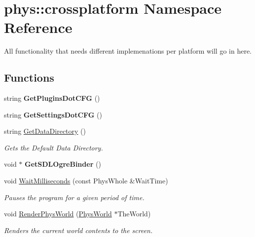 \hypertarget{namespacephys_1_1crossplatform}{
\section{phys::crossplatform Namespace Reference}
\label{d4/d59/namespacephys_1_1crossplatform}
}


All functionality that needs different implemenations per platform will go in here.  


\subsection*{Functions}
\begin{DoxyCompactItemize}
\item 
\hypertarget{namespacephys_1_1crossplatform_a8f7321f409f1f2a5fa07881ae22fcc2d}{
string {\bfseries GetPluginsDotCFG} ()}
\label{d4/d59/namespacephys_1_1crossplatform_a8f7321f409f1f2a5fa07881ae22fcc2d}

\item 
\hypertarget{namespacephys_1_1crossplatform_a2d43f3aa5a485564c3f375b36a08152f}{
string {\bfseries GetSettingsDotCFG} ()}
\label{d4/d59/namespacephys_1_1crossplatform_a2d43f3aa5a485564c3f375b36a08152f}

\item 
string \hyperlink{namespacephys_1_1crossplatform_ac73c7f2db76ddfeb41723d72decc1366}{GetDataDirectory} ()
\begin{DoxyCompactList}\small\item\em Gets the Default Data Directory. \item\end{DoxyCompactList}\item 
\hypertarget{namespacephys_1_1crossplatform_a596ed780d507e681d9261d26b64a8ed9}{
void $\ast$ {\bfseries GetSDLOgreBinder} ()}
\label{d4/d59/namespacephys_1_1crossplatform_a596ed780d507e681d9261d26b64a8ed9}

\item 
void \hyperlink{namespacephys_1_1crossplatform_aeecd8627f86a826cc1ad55bf45b11757}{WaitMilliseconds} (const PhysWhole \&WaitTime)
\begin{DoxyCompactList}\small\item\em Pauses the program for a given period of time. \item\end{DoxyCompactList}\item 
void \hyperlink{namespacephys_1_1crossplatform_a2025b17e592096a6fbb6d24619138c71}{RenderPhysWorld} (\hyperlink{classPhysWorld}{PhysWorld} $\ast$TheWorld)
\begin{DoxyCompactList}\small\item\em Renders the current world contents to the screen. \item\end{DoxyCompactList}\end{DoxyCompactItemize}


